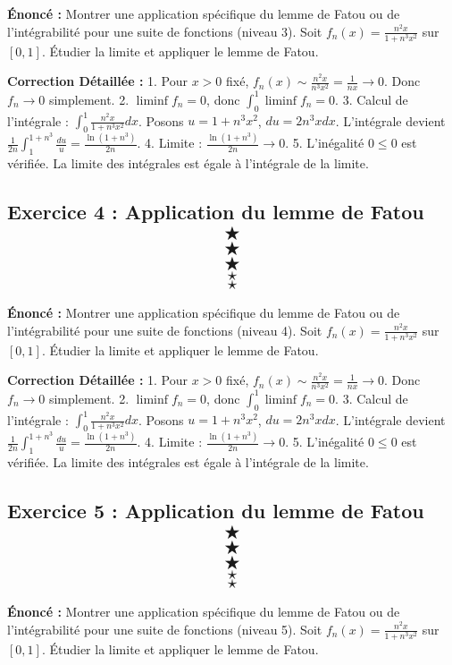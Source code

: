 \documentclass[11pt,a4paper]{article}
\begin{document}
\textbf{Énoncé :}
Montrer une application spécifique du lemme de Fatou ou de l'intégrabilité pour une suite de fonctions (niveau 3).
Soit $f_n(x) = \frac{n^2 x}{1 + n^3 x^2}$ sur $[0, 1]$.
Étudier la limite et appliquer le lemme de Fatou.

\textbf{Correction Détaillée :}
1. Pour $x > 0$ fixé, $f_n(x) \sim \frac{n^2 x}{n^3 x^2} = \frac{1}{n x} \to 0$. Donc $f_n \to 0$ simplement.
2. $\liminf f_n = 0$, donc $\int_0^1 \liminf f_n = 0$.
3. Calcul de l'intégrale : $\int_0^1 \frac{n^2 x}{1 + n^3 x^2} dx$.
   Posons $u = 1 + n^3 x^2$, $du = 2 n^3 x dx$.
   L'intégrale devient $\frac{1}{2n} \int_1^{1+n^3} \frac{du}{u} = \frac{\ln(1+n^3)}{2n}$.
4. Limite : $\frac{\ln(1+n^3)}{2n} \to 0$.
5. L'inégalité $0 \le 0$ est vérifiée. La limite des intégrales est égale à l'intégrale de la limite.


\subsection*{Exercice 4 : Application du lemme de Fatou $$\bigstar$$$$\bigstar$$$$\bigstar$$$$\star$$$$\star$$}

\textbf{Énoncé :}
Montrer une application spécifique du lemme de Fatou ou de l'intégrabilité pour une suite de fonctions (niveau 4).
Soit $f_n(x) = \frac{n^2 x}{1 + n^3 x^2}$ sur $[0, 1]$.
Étudier la limite et appliquer le lemme de Fatou.

\textbf{Correction Détaillée :}
1. Pour $x > 0$ fixé, $f_n(x) \sim \frac{n^2 x}{n^3 x^2} = \frac{1}{n x} \to 0$. Donc $f_n \to 0$ simplement.
2. $\liminf f_n = 0$, donc $\int_0^1 \liminf f_n = 0$.
3. Calcul de l'intégrale : $\int_0^1 \frac{n^2 x}{1 + n^3 x^2} dx$.
   Posons $u = 1 + n^3 x^2$, $du = 2 n^3 x dx$.
   L'intégrale devient $\frac{1}{2n} \int_1^{1+n^3} \frac{du}{u} = \frac{\ln(1+n^3)}{2n}$.
4. Limite : $\frac{\ln(1+n^3)}{2n} \to 0$.
5. L'inégalité $0 \le 0$ est vérifiée. La limite des intégrales est égale à l'intégrale de la limite.


\subsection*{Exercice 5 : Application du lemme de Fatou $$\bigstar$$$$\bigstar$$$$\bigstar$$$$\star$$$$\star$$}

\textbf{Énoncé :}
Montrer une application spécifique du lemme de Fatou ou de l'intégrabilité pour une suite de fonctions (niveau 5).
Soit $f_n(x) = \frac{n^2 x}{1 + n^3 x^2}$ sur $[0, 1]$.
Étudier la limite et appliquer le lemme de Fatou.
\end{document}
